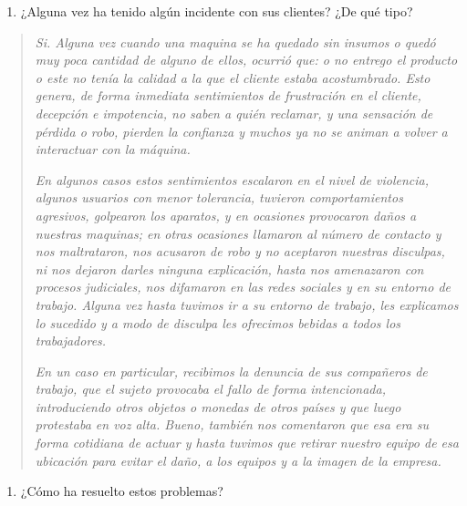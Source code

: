 \begin{enumerate}
\def\labelenumi{\arabic{enumi}.}
\setcounter{enumi}{5}
\item
  ¿Alguna vez ha tenido algún incidente con sus clientes? ¿De qué tipo?
\end{enumerate}

\begin{quote}
\emph{Si. Alguna vez cuando una maquina se ha quedado sin insumos o quedó muy poca cantidad de alguno de ellos, ocurrió que: o no entrego el producto o este no tenía la calidad a la que el cliente estaba acostumbrado. Esto genera, de forma inmediata sentimientos de frustración en el cliente, decepción e impotencia, no saben a quién reclamar, y una sensación de pérdida o robo, pierden la confianza y muchos ya no se animan a volver a interactuar con la máquina.}

\emph{En algunos casos estos sentimientos escalaron en el nivel de violencia, algunos usuarios con menor tolerancia, tuvieron comportamientos agresivos, golpearon los aparatos, y en ocasiones provocaron daños a nuestras maquinas; en otras ocasiones llamaron al número de contacto y nos maltrataron, nos acusaron de robo y no aceptaron nuestras disculpas, ni nos dejaron darles ninguna explicación, hasta nos amenazaron con procesos judiciales, nos difamaron en las redes sociales y en su entorno de trabajo. Alguna vez hasta tuvimos ir a su entorno de trabajo, les explicamos lo sucedido y a modo de disculpa les ofrecimos bebidas a todos los trabajadores.}

\emph{En un caso en particular, recibimos la denuncia de sus compañeros de trabajo, que el sujeto provocaba el fallo de forma intencionada, introduciendo otros objetos o monedas de otros países y que luego protestaba en voz alta. Bueno, también nos comentaron que esa era su forma cotidiana de actuar y hasta tuvimos que retirar nuestro equipo de esa ubicación para evitar el daño, a los equipos y a la imagen de la empresa.}
\end{quote}

\begin{enumerate}
\def\labelenumi{\arabic{enumi}.}
\setcounter{enumi}{6}
\item
  ¿Cómo ha resuelto estos problemas?
\end{enumerate}

